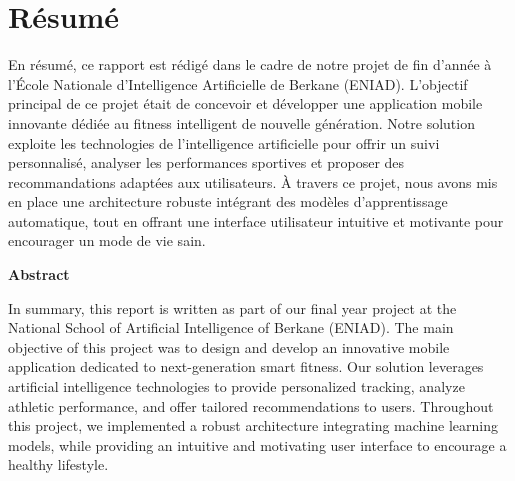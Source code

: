 \chapter*{Résumé}

En résumé, ce rapport est rédigé dans le cadre de notre projet de fin d'année à l'École Nationale d'Intelligence Artificielle de Berkane (ENIAD). L'objectif principal de ce projet était de concevoir et développer une application mobile innovante dédiée au fitness intelligent de nouvelle génération. Notre solution exploite les technologies de l'intelligence artificielle pour offrir un suivi personnalisé, analyser les performances sportives et proposer des recommandations adaptées aux utilisateurs. À travers ce projet, nous avons mis en place une architecture robuste intégrant des modèles d'apprentissage automatique, tout en offrant une interface utilisateur intuitive et motivante pour encourager un mode de vie sain.

\vspace{1cm}
\noindent\Large \textbf{Abstract} \normalsize\\
\vspace{0.5cm}

In summary, this report is written as part of our final year project at the National School of Artificial Intelligence of Berkane (ENIAD). The main objective of this project was to design and develop an innovative mobile application dedicated to next-generation smart fitness. Our solution leverages artificial intelligence technologies to provide personalized tracking, analyze athletic performance, and offer tailored recommendations to users. Throughout this project, we implemented a robust architecture integrating machine learning models, while providing an intuitive and motivating user interface to encourage a healthy lifestyle.